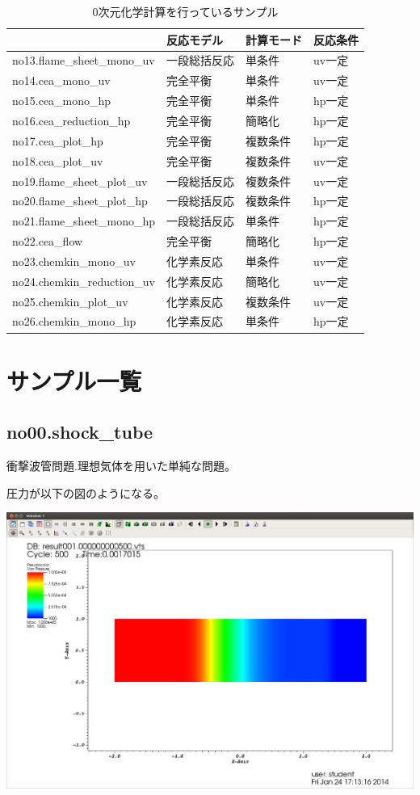 \documentclass{jsarticle}
\begin{document}
\begin{table}%
\centering
\caption{0次元化学計算を行っているサンプル}
\begin{tabular}{llll}
 & 反応モデル & 計算モード & 反応条件 \\
\hline
no13.flame\_sheet\_mono\_uv       & 一段総括反応 & 単条件   & uv一定 \\
no14.cea\_mono\_uv                & 完全平衡     & 単条件   & uv一定 \\
no15.cea\_mono\_hp                & 完全平衡     & 単条件   & hp一定 \\
no16.cea\_reduction\_hp           & 完全平衡     & 簡略化   & hp一定 \\
no17.cea\_plot\_hp                & 完全平衡     & 複数条件 & hp一定 \\
no18.cea\_plot\_uv                & 完全平衡     & 複数条件 & uv一定 \\
no19.flame\_sheet\_plot\_uv       & 一段総括反応 & 複数条件 & uv一定 \\
no20.flame\_sheet\_plot\_hp       & 一段総括反応 & 複数条件 & hp一定 \\
no21.flame\_sheet\_mono\_hp       & 一段総括反応 & 単条件   & hp一定 \\
no22.cea\_flow                    & 完全平衡     & 簡略化   & hp一定 \\
no23.chemkin\_mono\_uv            & 化学素反応   & 単条件   & uv一定 \\
no24.chemkin\_reduction\_uv       & 化学素反応   & 簡略化   & uv一定 \\
no25.chemkin\_plot\_uv            & 化学素反応   & 複数条件 & uv一定 \\
no26.chemkin\_mono\_hp            & 化学素反応   & 単条件   & hp一定 \\
\hline
\end{tabular}
\end{table}%
\newpage
\hspace{1em}
\newpage
\section{サンプル一覧}
\subsection{no00.shock\_tube}%
衝撃波管問題.理想気体を用いた単純な問題。

圧力が以下の図のようになる。
\begin{center}
\includegraphics[width=.6\textwidth,bb=0 0 1556 1054]{sample/no00.png}
\end{center}
\end{document}
